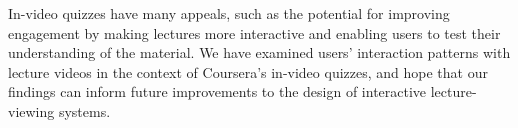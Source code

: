 \documentclass{sigchi}
\begin{document}
In-video quizzes have many appeals, such as the potential for improving engagement by making lectures more interactive and enabling users to test their understanding of the material. We have examined users' interaction patterns with lecture videos in the context of Coursera's in-video quizzes, and hope that our findings can inform future improvements to the design of interactive lecture-viewing systems.









\balance{}

%


\end{document}
